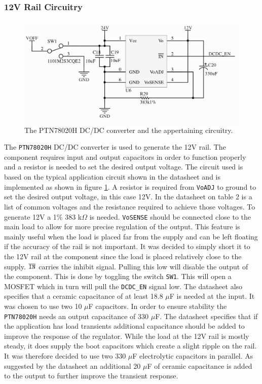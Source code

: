 

\subsubsection{12V Rail Circuitry}

\begin{figure}
	\centering
	\includegraphics[width=\linewidth]{graphics/dcdc12v}
	\caption{The PTN78020H DC/DC converter and the appertaining circuitry.}
	\label{fig:dcdc12v}
\end{figure}

The \texttt{PTN78020H} DC/DC converter is used to generate the 12V rail. 
The component requires input and output capacitors in order to function properly and a resistor is needed to set the desired output voltage. 
The circuit used is based on the typical application circuit shown in the datasheet \cite{PTN78020H} and is implemented as shown in figure \ref{fig:dcdc12v}.
A resistor is required from \texttt{VoADJ} to ground to set the desired output voltage, in this case 12V.
In the datasheet on table 2 is a list of common voltages and the resistance required to achieve those voltages.
To generate 12V a 1\% 383 k$\Omega$ is needed.
\texttt{VoSENSE} should be connected close to the main load to allow for more precise regulation of the output.
This feature is mainly useful when the load is placed far from the supply and can be left floating if the accuracy of the rail is not important.
It was decided to simply short it to the 12V rail at the component since the load is placed relatively close to the supply.
$\overline{\text{\texttt{IN}}}$ carries the inhibit signal.
Pulling this low will disable the output of the component.
This is done by toggling the switch \texttt{SW1}. 
This will open a MOSFET which in turn will pull the \texttt{DCDC\_EN} signal low.
The datasheet also specifies that a ceramic capacitance of at least 18.8 $\mu$F is needed at the input. 
It was chosen to use two 10 $\mu$F capacitors.
In order to ensure stability the \texttt{PTN78020H} needs an output capacitance of 330 $\mu$F.
The datasheet specifies that if the application has load transients additional capacitance should be added to improve the response of the regulator.
While the load at the 12V rail is mostly steady, it does supply the boot capacitors which create a slight ripple on the rail.
It was therefore decided to use two 330 $\mu$F electrolytic capacitors in parallel.
As suggested by the datasheet an additional 20 $\mu$F of ceramic capacitance is added to the output to further improve the transient response.\\

